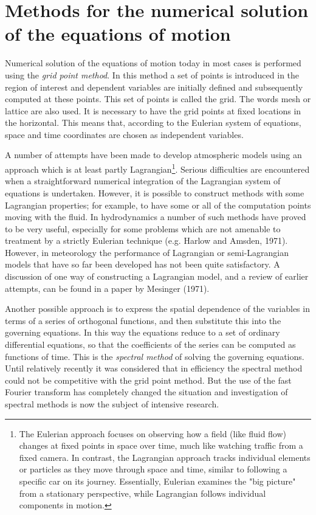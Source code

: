 \section{Methods for the numerical solution of the equations of motion}
Numerical solution of the equations of motion today in most cases is performed using the \textit{grid point method}. In this method a set of points is introduced in the region of interest and dependent variables are initially defined and subsequently computed at these points. This set of points is called the grid. The words mesh or lattice are also used. It is necessary to have the grid points at fixed locations in the horizontal. This means that, according to the Eulerian system of equations, space and time coordinates are chosen as independent variables.

A number of attempts have been made to develop atmospheric models using an approach which is at least partly Lagrangian\footnote{The Eulerian approach focuses on observing how a field (like fluid flow) changes at fixed points in space over time, much like watching traffic from a fixed camera. In contrast, the Lagrangian approach tracks individual elements or particles as they move through space and time, similar to following a specific car on its journey. Essentially, Eulerian examines the "big picture" from a stationary perspective, while Lagrangian follows individual components in motion.}. Serious difficulties are encountered when a straightforward numerical integration of the Lagrangian system of equations is undertaken. However, it is possible to construct methods with some Lagrangian properties; for example, to have some or all of the compu­tation points moving with the fluid. In hydrodynamics a number of such methods have proved to be very useful, especially for some problems which are not amenable to treatment by a strictly Eulerian technique (e.g. Harlow and Amsden, 1971). However, in meteorology the per­formance of Lagrangian or semi-Lagrangian models that have so far been developed has not been quite satis­factory. A discussion of one way of constructing a Lagrangian model, and a review of earlier attempts, can be found in a paper by Mesinger (1971).

Another possible approach is to express the spatial dependence of the variables in terms of a series of ortho­gonal functions, and then substitute this into the governing equations. In this way the equations reduce to a set of ordinary differential equations, so that the coefficients of the series can be computed as functions of time. This is the \textit{spectral method} of solving the governing equations. Until relatively recently it was considered that in effi­ciency the spectral method could not be competitive with the grid point method. But the use of the fast Fourier transform has completely changed the situation and investigation of spectral methods is now the subject of intensive research.

